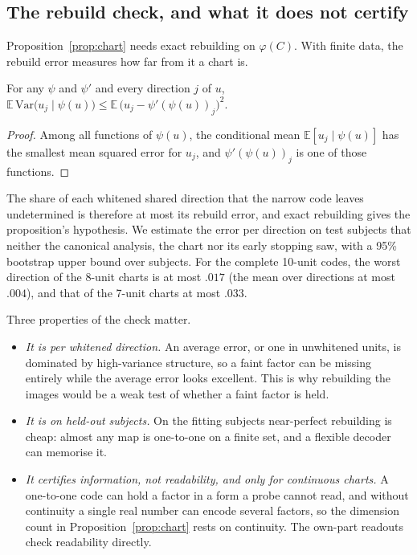 \subsection{The rebuild check, and what it does not certify}
\label{sec:theory-check}

Proposition~\ref{prop:chart} needs exact rebuilding on $\varphi(C)$. With finite
data, the rebuild error measures how far from it a chart is.

\begin{lemma}
\label{lem:rebuild}
For any $\psi$ and $\psi'$ and every direction $j$ of $u$,
$\mathbb{E}\,\mathrm{Var}\bigl(u_j \mid \psi(u)\bigr) \le
\mathbb{E}\,\bigl(u_j - \psi'(\psi(u))_j\bigr)^2$.
\end{lemma}
\begin{proof}
Among all functions of $\psi(u)$, the conditional mean
$\mathbb{E}[u_j \mid \psi(u)]$ has the smallest mean squared error for $u_j$, and
$\psi'(\psi(u))_j$ is one of those functions.
\end{proof}

The share of each whitened shared direction that the narrow code leaves
undetermined is therefore at most its rebuild error, and exact rebuilding gives
the proposition's hypothesis. We estimate the error per direction on test
subjects that neither the canonical analysis, the chart nor its early stopping
saw, with a 95\% bootstrap upper bound over subjects. For the complete 10-unit
codes, the worst direction of the 8-unit charts is at most $.017$ (the mean over
directions at most $.004$), and that of the 7-unit charts at most $.033$.

Three properties of the check matter.
\begin{itemize}
\item \emph{It is per whitened direction.} An average error, or one in
  unwhitened units, is dominated by high-variance structure, so a faint factor
  can be missing entirely while the average error looks excellent. This is why
  rebuilding the images would be a weak test of whether a faint factor is held.
\item \emph{It is on held-out subjects.} On the fitting subjects near-perfect
  rebuilding is cheap: almost any map is one-to-one on a finite set, and a
  flexible decoder can memorise it.
\item \emph{It certifies information, not readability, and only for continuous
  charts.} A one-to-one code can hold a factor in a form a probe cannot read,
  and without continuity a single real number can encode several factors, so
  the dimension count in Proposition~\ref{prop:chart} rests on continuity. The
  own-part readouts check readability directly.
\end{itemize}


